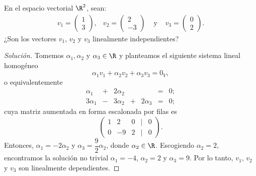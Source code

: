 \documentclass[a4,11pt]{aleph-notas}
\begin{document}
\encabezado

\begin{ejer}
    En el espacio vectorial $\R^{2}$, sean:
    \[
        \begin{array}{cccc}
            v_1 = \begin{pmatrix} 1\\ 3 \end{pmatrix}, &
            v_2 = \begin{pmatrix} 2\\ -3 \end{pmatrix} &
            \text{ y } &
            v_3 = \begin{pmatrix} 0\\ 2 \end{pmatrix}.
        \end{array}
    \]
    ¿Son los vectores $v_1$, $v_2$ y $v_3$ linealmente independientes?
\end{ejer}

\begin{proof}[Solución]\hspace{0pt}
    Tomemos $\alpha_1, \alpha_2$ y $\alpha_3\in\R$ y planteamos el siguiente sistema lineal homogéneo
    \[
        \alpha_1 v_1 + \alpha_2 v_2 + \alpha_3 v_3 = 0_V,
    \]
    o equivalentemente
    \[
        \begin{array}{ccccccc}
            \alpha_1 & + & 2\alpha_2 & & & = & 0;\\
            3\alpha_1 & - & 3\alpha_2 & + & 2\alpha_3& = & 0;
        \end{array}
    \]
    cuya matriz aumentada en forma escalonada por filas es
    \[
        \begin{pmatrix}
            1 & 2 & 0 & | & 0\\
            0 & -9 & 2 & | & 0
        \end{pmatrix}.
    \]
    Entonces, $\alpha_1 = -2\alpha_2$ y $\alpha_3 = \dfrac{9}{2}\alpha_2$, donde $\alpha_2\in\R$. Escogiendo $\alpha_{2} = 2$, encontramos la solución no trivial $\alpha_{1}=-4$, $\alpha_2=2$ y $\alpha_3 = 9$. Por lo tanto, $v_1$, $v_2$ y $v_3$ son linealmente dependientes.
\end{proof}
\end{document}
